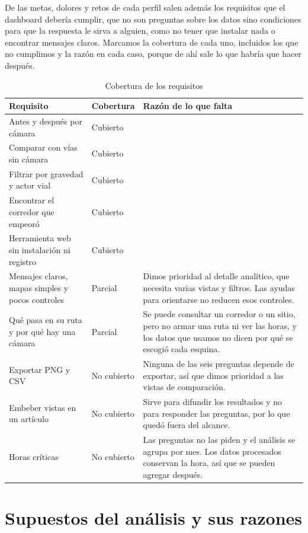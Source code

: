 \documentclass[10pt,a4paper]{article}
\begin{document}
De las metas, dolores y retos de cada perfil salen además los requisitos que el dashboard debería cumplir, que no son preguntas sobre los datos sino condiciones para que la respuesta le sirva a alguien, como no tener que instalar nada o encontrar mensajes claros. Marcamos la cobertura de cada uno, incluidos los que no cumplimos y la razón en cada caso, porque de ahí sale lo que habría que hacer después.

\begin{table}[H]\centering\small
\begin{tabularx}{\linewidth}{P{5.2cm}P{2cm}L}
\toprule
\textbf{Requisito} & \textbf{Cobertura} & \textbf{Razón de lo que falta}\\
\midrule
Antes y después por cámara & Cubierto & \\
Comparar con vías sin cámara & Cubierto & \\
Filtrar por gravedad y actor vial & Cubierto & \\
Encontrar el corredor que empeoró & Cubierto & \\
Herramienta web sin instalación ni registro & Cubierto & \\
Mensajes claros, mapas simples y pocos controles & Parcial & Dimos prioridad al detalle analítico, que necesita varias vistas y filtros. Las ayudas para orientarse no reducen esos controles.\\
Qué pasa en su ruta y por qué hay una cámara & Parcial & Se puede consultar un corredor o un sitio, pero no armar una ruta ni ver las horas, y los datos que usamos no dicen por qué se escogió cada esquina.\\
Exportar PNG y CSV & No cubierto & Ninguna de las seis preguntas depende de exportar, así que dimos prioridad a las vistas de comparación.\\
Embeber vistas en un artículo & No cubierto & Sirve para difundir los resultados y no para responder las preguntas, por lo que quedó fuera del alcance.\\
Horas críticas & No cubierto & Las preguntas no las piden y el análisis se agrupa por mes. Los datos procesados conservan la hora, así que se pueden agregar después.\\
\bottomrule
\end{tabularx}
\caption{Cobertura de los requisitos}
\end{table}

\section{Supuestos del análisis y sus razones}
\end{document}
